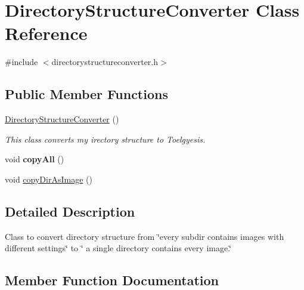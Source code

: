 \hypertarget{classDirectoryStructureConverter}{}\section{Directory\+Structure\+Converter Class Reference}
\label{classDirectoryStructureConverter}


{\ttfamily \#include $<$directorystructureconverter.\+h$>$}

\subsection*{Public Member Functions}
\begin{DoxyCompactItemize}
\item 
\hyperlink{classDirectoryStructureConverter_accd0d22fdda9e6476dbfe86288d11e92}{Directory\+Structure\+Converter} ()\hypertarget{classDirectoryStructureConverter_accd0d22fdda9e6476dbfe86288d11e92}{}\label{classDirectoryStructureConverter_accd0d22fdda9e6476dbfe86288d11e92}

\begin{DoxyCompactList}\small\item\em This class converts my irectory structure to Toelgyesi\textquotesingle{}s. \end{DoxyCompactList}\item 
void {\bfseries copy\+All} ()\hypertarget{classDirectoryStructureConverter_a61066e6fb5aeed435455add89496586e}{}\label{classDirectoryStructureConverter_a61066e6fb5aeed435455add89496586e}

\item 
void \hyperlink{classDirectoryStructureConverter_aaf899b4074354b0f9fb22be7448f8a36}{copy\+Dir\+As\+Image} ()
\end{DoxyCompactItemize}


\subsection{Detailed Description}
Class to convert directory structure from \char`\"{}every subdir contains images with different settings\char`\"{} to \char`\"{} a single directory contains every image.\char`\"{} 

\subsection{Member Function Documentation}
